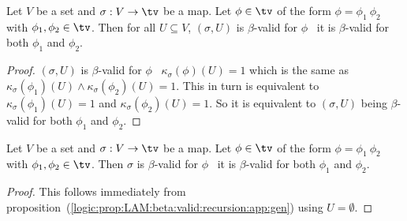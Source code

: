\begin{prop}\label{logic:prop:LAM:beta:valid:recursion:app:gen}
    Let $V$ be a set and $\sigma:V\to\tv$ be a map. Let $\phi\in\tv$ 
    of the form $\phi=\phi_{1}\ \phi_{2}$ with $\phi_{1},\phi_{2}\in\tv$. 
    Then for all $U\subseteq V$,  $(\sigma,U)$ is $\beta$-valid for $\phi$ 
    \ifand\ it is $\beta$-valid for both $\phi_{1}$ and $\phi_{2}$.
\end{prop}
\begin{proof}
    $(\sigma,U)$ is $\beta$-valid for $\phi$ \ifand\ $\kappa_{\sigma}(\phi)(U)
    =1$ which is the same as $\kappa_{\sigma}(\phi_{1})(U)\land\kappa_{\sigma}
    (\phi_{2})(U)=1$. This in turn is equivalent to $\kappa_{\sigma}
    (\phi_{1})(U)=1$ and $\kappa_{\sigma}(\phi_{2})(U)=1$. So it is 
    equivalent to $(\sigma,U)$ being $\beta$-valid for both $\phi_{1}$ and
    $\phi_{2}$.
\end{proof}

\begin{prop}\label{logic:prop:LAM:beta:valid:recursion:app}
    Let $V$ be a set and $\sigma:V\to\tv$ be a map. Let $\phi\in\tv$ 
    of the form $\phi=\phi_{1}\ \phi_{2}$ with $\phi_{1},\phi_{2}\in\tv$. 
    Then $\sigma$ is $\beta$-valid for $\phi$ 
    \ifand\ it is $\beta$-valid for both $\phi_{1}$ and $\phi_{2}$.
\end{prop}
\begin{proof}
    This follows immediately from 
    proposition~(\ref{logic:prop:LAM:beta:valid:recursion:app:gen}) using 
    $U=\emptyset$.
\end{proof}

